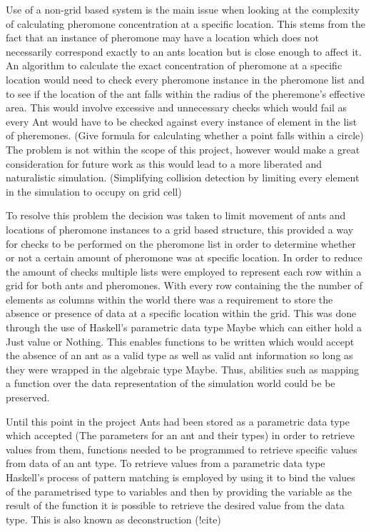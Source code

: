 \documentclass[main.tex]{subfiles}
\begin{document}
Use of a non-grid based system is the main issue when looking at the complexity of calculating pheromone concentration at a specific location. This stems from the fact that an instance of pheromone may have a location which does not necessarily correspond exactly to an ants location but is close enough to affect it. An algorithm to calculate the exact concentration of pheromone at a specific location would need to check every pheromone instance in the pheromone list and to see if the location of the ant falls within the radius of the pheremone's effective area. This would involve excessive and unnecessary checks which would fail as every Ant would have to be checked against every instance of element in the list of pheremones.
(Give formula for calculating whether a point falls within a circle)
The problem is not within the scope of this project, however would make a great consideration for future work as this would lead to a more liberated and naturalistic simulation. (Simplifying collision detection by limiting every element in the simulation to occupy on grid cell)

To resolve this problem the decision was taken to limit movement of ants and locations of pheromone instances to a grid based structure, this provided a way for checks to be performed on the pheromone list  in order to determine whether or not a certain amount of pheromone was at specific location. In order to reduce the amount of checks multiple lists were employed to represent each row within a grid for both ants and pheromones. With every row containing the the number of elements as columns within the world there was a requirement to store the absence or presence of data at a specific location within the grid. This was done through the use of Haskell's parametric data type Maybe which can either hold a Just value or Nothing. This enables functions to be written which would accept the absence of an ant as a valid type as well as valid ant information so long as they were wrapped in the algebraic type Maybe. Thus, abilities such as mapping a function over the data representation of the simulation world could be be preserved.

Until this point in the project Ants had been stored as a parametric data type which accepted (The parameters for an ant and their types) in order to retrieve values from them, functions needed to be programmed to retrieve specific values from data of an ant type. To retrieve values from a parametric data type Haskell's process of pattern matching is employed by using it to bind the values of the parametrised type to variables and  then by providing the variable as the result of the function it is possible to retrieve the desired value from the data type. This is also known as deconstruction (!cite)
\end{document}
